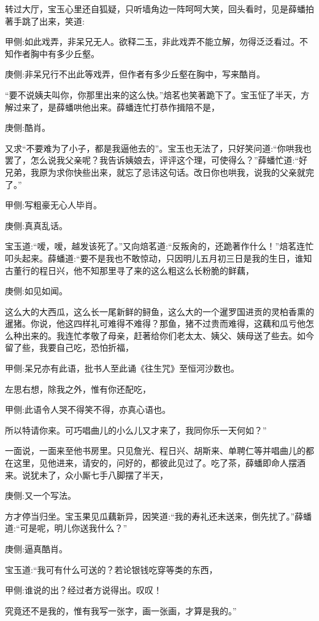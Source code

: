 \begin{parag}
    转过大厅，宝玉心里还自狐疑，只听墙角边一阵呵呵大笑，回头看时，见是薛蟠拍著手跳了出来，笑道:\begin{note}甲侧:如此戏弄，非呆兄无人。欲释二玉，非此戏弄不能立解，勿得泛泛看过。不知作者胸中有多少丘壑。\end{note}\begin{note}庚侧:非呆兄行不出此等戏弄，但作者有多少丘壑在胸中，写来酷肖。\end{note}“要不说姨夫叫你，你那里出来的这么快。”焙茗也笑著跪下了。宝玉怔了半天，方解过来了，是薛蟠哄他出来。薛蟠连忙打恭作揖陪不是，\begin{note}庚侧:酷肖。\end{note}又求“不要难为了小子，都是我逼他去的”。宝玉也无法了，只好笑问道:“你哄我也罢了，怎么说我父亲呢？我告诉姨娘去，评评这个理，可使得么？”薛蟠忙道:“好兄弟，我原为求你快些出来，就忘了忌讳这句话。改日你也哄我，说我的父亲就完了。”\begin{note}甲侧:写粗豪无心人毕肖。\end{note}\begin{note}庚侧:真真乱话。\end{note}宝玉道:“嗳，嗳，越发该死了。”又向焙茗道:“反叛肏的，还跪著作什么！”焙茗连忙叩头起来。薛蟠道:“要不是我也不敢惊动，只因明儿五月初三日是我的生日，谁知古董行的程日兴，他不知那里寻了来的这么粗这么长粉脆的鲜藕，\begin{note}庚侧:如见如闻。\end{note}这么大的大西瓜，这么长一尾新鲜的鲟鱼，这么大的一个暹罗国进贡的灵柏香熏的暹猪。你说，他这四样礼可难得不难得？那鱼，猪不过贵而难得，这藕和瓜亏他怎么种出来的。我连忙孝敬了母亲，赶著给你们老太太、姨父、姨母送了些去。如今留了些，我要自己吃，恐怕折福，\begin{note}甲侧:呆兄亦有此语，批书人至此诵《往生咒》至恒河沙数也。\end{note}左思右想，除我之外，惟有你还配吃，\begin{note}甲侧:此语令人哭不得笑不得，亦真心语也。\end{note}所以特请你来。可巧唱曲儿的小么儿又才来了，我同你乐一天何如？”
\end{parag}


\begin{parag}
    一面说，一面来至他书房里。只见詹光、程日兴、胡斯来、单聘仁等并唱曲儿的都在这里，见他进来，请安的，问好的，都彼此见过了。吃了茶，薛蟠即命人摆酒来。说犹未了，众小厮七手八脚摆了半天，\begin{note}庚侧:又一个写法。\end{note}方才停当归坐。宝玉果见瓜藕新异，因笑道:“我的寿礼还未送来，倒先扰了。”薛蟠道:“可是呢，明儿你送我什么？”\begin{note}庚侧:逼真酷肖。\end{note}宝玉道:“我可有什么可送的？若论银钱吃穿等类的东西，\begin{note}甲侧:谁说的出？经过者方说得出。叹叹！\end{note}究竟还不是我的，惟有我写一张字，画一张画，才算是我的。”
\end{parag}


